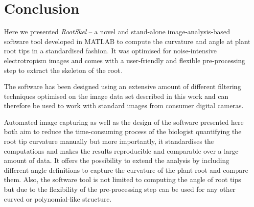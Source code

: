 
\chapter{Conclusion} %

\label{conclusion} %

%







Here we presented \textit{RootSkel} -- a novel and stand-alone image-analysis-based software tool developed in MATLAB to compute the curvature and angle at plant root tips in a standardised fashion. It was optimised for noise-intensive electrotropism images and comes with a user-friendly and flexible pre-processing step to extract the skeleton of the root. %

The software has been designed using an extensive amount of different filtering techniques optimised on the image data set described in this work and can therefore be used to work with standard images from consumer digital cameras. 

Automated image capturing as well as the design of the software presented here both aim to reduce the time-consuming process of the biologist quantifying the root tip curvature manually but more importantly, it standardises the computations and makes the results reproducible and comparable over a large amount of data. It offers the possibility to extend the analysis by including different angle definitions to capture the curvature of the plant root and compare them. Also, the software tool is not limited to computing the angle of root tips but due to the flexibility of the pre-processing step can be used for any other curved or polynomial-like structure. 

